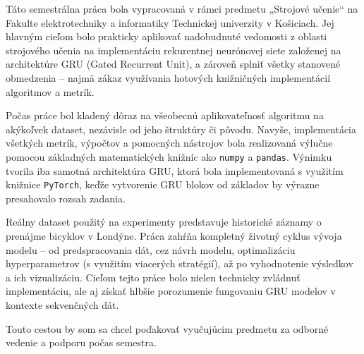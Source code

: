\documentclass[]{KKUIzaverecnaPraca}
\begin{document}
\predhovor
Táto semestrálna práca bola vypracovaná v rámci predmetu „Strojové učenie“ na Fakulte elektrotechniky a informatiky Technickej univerzity v Košiciach. Jej hlavným cieľom bolo prakticky aplikovať nadobudnuté vedomosti z oblasti strojového učenia na implementáciu rekurentnej neurónovej siete založenej na architektúre GRU (Gated Recurrent Unit), a zároveň splniť všetky stanovené obmedzenia – najmä zákaz využívania hotových knižničných implementácií algoritmov a metrík.

Počas práce bol kladený dôraz na všeobecnú aplikovateľnosť algoritmu na akýkoľvek dataset, nezávisle od jeho štruktúry či pôvodu. Navyše, implementácia všetkých metrík, výpočtov a pomocných nástrojov bola realizovaná výlučne pomocou základných matematických knižníc ako \texttt{numpy} a \texttt{pandas}. Výnimku tvorila iba samotná architektúra GRU, ktorá bola implementovaná s využitím knižnice \texttt{PyTorch}, keďže vytvorenie GRU blokov od základov by výrazne presahovalo rozsah zadania.

Reálny dataset použitý na experimenty predstavuje historické záznamy o prenájme bicyklov v Londýne. Práca zahŕňa kompletný životný cyklus vývoja modelu – od predspracovania dát, cez návrh modelu, optimalizáciu hyperparametrov (s využitím viacerých stratégií), až po vyhodnotenie výsledkov a ich vizualizáciu. Cieľom tejto práce bolo nielen technicky zvládnuť implementáciu, ale aj získať hlbšie porozumenie fungovaniu GRU modelov v kontexte sekvenčných dát.

Touto cestou by som sa chcel poďakovať vyučujúcim predmetu za odborné vedenie a podporu počas semestra.
\kpredhovoru

\thispagestyle{empty}
\tableofcontents
\newpage

\thispagestyle{empty}

{	\makeatletter
	\renewcommand{\l@figure}{\@dottedtocline{1}{1.5em}{3.5em}}
	\makeatother
	\listoffigures}



\newpage

\thispagestyle{empty}
\listoftables
\newpage

\thispagestyle{empty}
\newpage

\slovnikterminov
\end{document}
